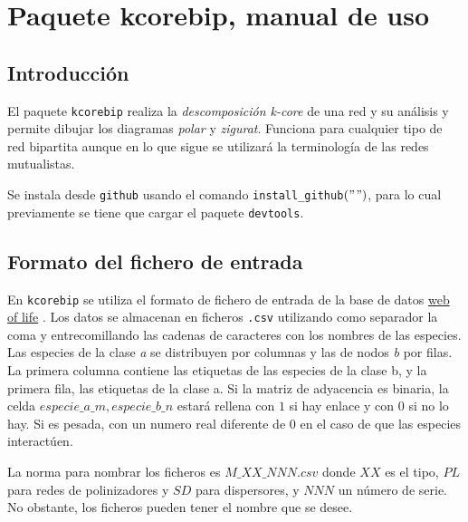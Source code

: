 
\appendix
\renewcommand{\thechapter}{B}
\chapter{Paquete kcorebip, manual de uso} %

\label{APP_KCOREMANBIP} %

\section{Introducción}

El paquete \texttt{kcorebip} realiza la \textit{descomposición k-core} de una red y su análisis y permite dibujar los diagramas \textit{polar}
y \textit{zigurat}. Funciona para cualquier tipo de red bipartita aunque en lo que sigue se utilizará la terminología de las redes mutualistas.

Se instala desde \texttt{github} usando el comando \texttt{install\_github}$("$$")$, para lo cual previamente se tiene que cargar el paquete \texttt{devtools}.
 
\section{Formato del fichero de entrada}
\label{input_file_format}

En \texttt{kcorebip} se utiliza el formato de fichero de entrada de la base de datos \href{http://www.web-of-life.es/}{web of life} \cite{bascompte2009}. Los datos se almacenan en ficheros \texttt{.csv} utilizando como separador la coma y entrecomillando las cadenas de caracteres con los nombres de las especies. Las especies de la clase \textit{a} se distribuyen por columnas y las de nodos \textit{b} por filas. La primera columna contiene las etiquetas de las especies de la clase b, y la primera fila, las etiquetas de la clase a. Si la matriz de adyacencia es binaria, la celda $especie\_a\_m,especie\_b\_n$ estará rellena con $1$ si hay enlace y con $0$ si no lo hay. Si es pesada, con un numero real diferente de $0$ en el caso de que las especies interactúen.

La norma para nombrar los ficheros es $M\_XX\_NNN.csv$ donde $XX$ es el tipo, $PL$ para redes de polinizadores y $SD$ para dispersores, y $NNN$ un número de serie. No obstante, los ficheros pueden tener el nombre que se desee.

